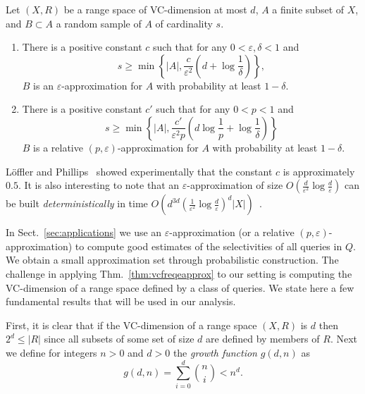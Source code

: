 \begin{theorem}\label{thm:vcfreqeapprox}
Let $(X,R)$ be a range space of VC-dimension at most $d$,  $A$ a finite subset of $X$, and $B\subset
  A$ a random sample of $A$ of cardinality $s$. 
  \begin{enumerate}
\item
  There is a positive constant $c$ such that for any 
  $0<\varepsilon,\delta<1$  and  
  \begin{equation}\label{eq:vcfreqeapprox}
  s\ge\min\left\{|A|,\frac{c}{\varepsilon^2}\left(d+\log\frac{1}{\delta}\right)\right\},
  \end{equation}  $B$ is an $\varepsilon$-approximation for $A$ with probability at least $1-\delta$.
\item
There is a positive constant $c'$ such that for any $0<p<1$ and
  $$s\ge\min\left\{|A|,\frac{c'}{\varepsilon^2p}\left(d\log{\frac{1}{p}}+\log\frac{1}{\delta}\right)\right\}$$
  $B$ is a relative
  $(p,\varepsilon)$-approximation for $A$ with probability at least $1-\delta$.
  \end{enumerate}
\end{theorem}

L\"offler and Phillips~\citeyearpar{LofflerP09} showed experimentally that the constant
$c$ is approximately $0.5$. It is also interesting to note that an
$\varepsilon$-approximation of size
$O(\frac{d}{\varepsilon^2}\log{\frac{d}{\varepsilon}})$ can be built
\emph{deterministically} in time
$O(d^{3d}(\frac{1}{\varepsilon^2}\log{\frac{d}{\varepsilon}})^d|X|)$~\citep{Chazelle00}.

In Sect.~\ref{sec:applications} we use an
$\varepsilon$-approximation (or a relative $(p,\varepsilon)$-approximation)  to
compute good estimates of the selectivities of all queries in $Q$. We obtain a
small approximation set through probabilistic construction.
The challenge in applying Thm.~\ref{thm:vcfreqeapprox} to our setting is computing the
VC-dimension of a range space defined by a class of queries. 
We state here a few fundamental results that will be used in our analysis. 

First, it is
clear that if the VC-dimension of a range space $(X,R)$ is $d$ then $2^d\leq
|R|$ since all subsets of some set of size $d$ are defined by members of $R$.
Next we define for integers $n>0$ and $d>0$ the {\em growth function}
$g(d,n)$ as
  \[
  g(d,n)=\sum_{i=0}^d\binom{n}{i} < n^d .\]

